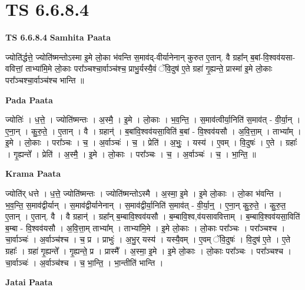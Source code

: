 \documentclass[17pt]{extarticle}
\begin{document}
\section{ TS 6.6.8.4 }

\textbf{TS 6.6.8.4 } \newline
\textbf{Samhita Paata} \newline

ज्योति॑र्द्धत्ते॒ ज्योति॑ष्मन्तोऽस्मा इ॒मे लो॒का भ॑वन्ति स॒माव॑द्-वीर्यानेनान् कुरुत ए॒तान्. वै ग्रहा᳚न् ब॒बां-वि॒श्वव॑यसा-ववित्तां॒ ताभ्या॑मि॒मे लो॒काः परा᳚ञ्चश्चा॒र्वाञ्च॑श्च॒ प्राभु॒र्यस्यै॒वं ॅवि॒दुष॑ ए॒ते ग्रहा॑ गृ॒ह्यन्ते॒ प्रास्मा॑ इ॒मे लो॒काः परा᳚ञ्चश्चा॒र्वाञ्च॑श्च भान्ति ॥ \newline

\textbf{Pada Paata} \newline

ज्योतिः॑ । ध॒त्ते॒ । ज्योति॑ष्मन्तः । अ॒स्मै॒ । इ॒मे । लो॒काः । भ॒व॒न्ति॒ । स॒माव॑त्वीर्या॒निति॑ स॒माव॑त् - वी॒र्या॒न् । ए॒ना॒न् । कु॒रु॒ते॒ । ए॒तान् । वै । ग्रहान्॑ । ब॒बांवि॒श्वव॑यसा॒विति॑ ब॒बां - वि॒श्वव॑यसौ । अ॒वि॒त्ता॒म् । ताभ्या᳚म् । इ॒मे । लो॒काः । परा᳚ञ्चः । च॒ । अ॒र्वाञ्चः॑ । च॒ । प्रेति॑ । अ॒भुः॒ । यस्य॑ । ए॒वम् । वि॒दुषः॑ । ए॒ते । ग्रहाः᳚ । गृ॒ह्यन्ते᳚ । प्रेति॑ । अ॒स्मै॒ । इ॒मे । लो॒काः । परा᳚ञ्चः । च॒ । अ॒र्वाञ्चः॑ । च॒ । भा॒न्ति॒ ॥  \newline


\textbf{Krama Paata} \newline

ज्योति॑र् धत्ते । ध॒त्ते॒ ज्योति॑ष्मन्तः । ज्योति॑ष्मन्तोऽस्मै । अ॒स्मा॒ इ॒मे । इ॒मे लो॒काः । लो॒का भ॑वन्ति । भ॒व॒न्ति॒ स॒माव॑द्वीर्यान् । स॒माव॑द्वीर्यानेनान् । स॒माव॑द्वीर्या॒निति॑ स॒माव॑त् - वी॒र्या॒न्॒ । ए॒ना॒न् कु॒रु॒ते॒ । कु॒रु॒त॒ ए॒तान् । ए॒तान्. वै । वै ग्रहान्॑ । ग्रहा᳚न् ब॒म्बावि॒श्वव॑यसौ । ब॒म्बावि॒श्व,व॑यसाववित्ताम् । ब॒म्बावि॒श्वव॑यसा॒विति॑ ब॒म्बा - वि॒श्वव॑यसौ । अ॒वि॒त्ता॒म् ताभ्या᳚म् । ताभ्या॑मि॒मे । इ॒मे लो॒काः । लो॒काः परा᳚ञ्चः । परा᳚ञ्चश्च । चा॒र्वाञ्चः॑ । अ॒र्वाञ्च॑श्च । च॒ प्र । प्राभुः॑ । अ॒भु॒र् यस्य॑ । यस्यै॒वम् । ए॒वम् ॅवि॒दुषः॑ । वि॒दुष॑ ए॒ते । ए॒ते ग्रहाः᳚ । ग्रहा॑ गृ॒ह्यन्ते᳚ । गृ॒ह्यन्ते॒ प्र । प्रास्मै᳚ । अ॒स्मा॒ इ॒मे । इ॒मे लो॒काः । लो॒काः परा᳚ञ्चः । परा᳚ञ्चश्च । चा॒र्वाञ्चः॑ । अ॒र्वाञ्च॑श्च । च॒ भा॒न्ति॒ । भा॒न्तीति॑ भान्ति । \newline

\textbf{Jatai Paata} \newline
\end{document}
